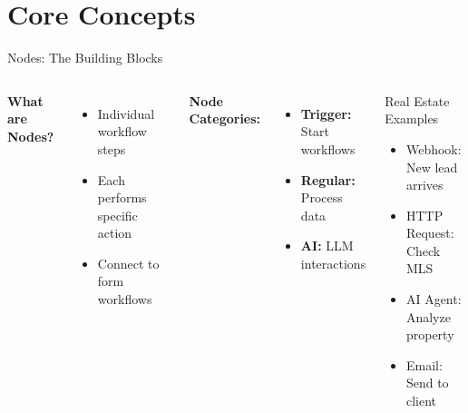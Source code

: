 \documentclass{beamer}
\begin{document}
\section{Core Concepts}

\begin{frame}{Nodes: The Building Blocks}
  \footnotesize
  \begin{columns}[onlytextwidth]
      \textbf{What are Nodes?}
      \begin{itemize}
        \item Individual workflow steps
        \item Each performs specific action
        \item Connect to form workflows
      \end{itemize}
      
      \textbf{Node Categories:}
      \begin{itemize}
        \item \textbf{Trigger:} Start workflows
        \item \textbf{Regular:} Process data
        \item \textbf{AI:} LLM interactions
      \end{itemize}
    
      \begin{block}{Real Estate Examples}
        \begin{itemize}
          \item Webhook: New lead arrives
          \item HTTP Request: Check MLS
          \item AI Agent: Analyze property
          \item Email: Send to client
        \end{itemize}
      \end{block}
  \end{columns}
\end{frame}
\end{document}
